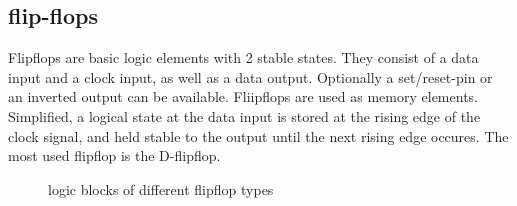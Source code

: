 \subsection{flip-flops}
\label{ch:flipflops}
Flipflops are basic logic elements with 2 stable states. They consist of a data input and a clock input, as well as a data output. Optionally a set/reset-pin or an inverted output can be available. Fliipflops are used as memory elements. Simplified, a logical state at the data input is stored at the rising edge of the clock signal, and held stable to the output until the next rising edge occures. The most used flipflop is the D-flipflop.
\begin{figure}
\begin{center}
\caption{logic blocks of different flipflop types}
\end{center}
\end{figure}

